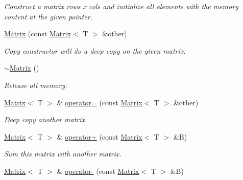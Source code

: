 \begin{DoxyCompactItemize}
\begin{DoxyCompactList}\small\item\em Construct a matrix rows x cols and initialize all elements with the memory content at the given pointer. \end{DoxyCompactList}\item 
\hyperlink{classanpi_1_1Matrix_a336997e2f4cf238db9f2fb9992144f23}{Matrix} (const \hyperlink{classanpi_1_1Matrix}{Matrix}$<$ T $>$ \&other)\hypertarget{classanpi_1_1Matrix_a336997e2f4cf238db9f2fb9992144f23}{}\label{classanpi_1_1Matrix_a336997e2f4cf238db9f2fb9992144f23}

\begin{DoxyCompactList}\small\item\em Copy constructor will do a deep copy on the given matrix. \end{DoxyCompactList}\item 
\hyperlink{classanpi_1_1Matrix_acd9cb8d3e7b77bb14d9ce6d153ac5634}{$\sim$\+Matrix} ()\hypertarget{classanpi_1_1Matrix_acd9cb8d3e7b77bb14d9ce6d153ac5634}{}\label{classanpi_1_1Matrix_acd9cb8d3e7b77bb14d9ce6d153ac5634}

\begin{DoxyCompactList}\small\item\em Release all memory. \end{DoxyCompactList}\item 
\hyperlink{classanpi_1_1Matrix}{Matrix}$<$ T $>$ \& \hyperlink{classanpi_1_1Matrix_acba9e336b083b5d6b58fe24f7942ddbe}{operator=} (const \hyperlink{classanpi_1_1Matrix}{Matrix}$<$ T $>$ \&other)\hypertarget{classanpi_1_1Matrix_acba9e336b083b5d6b58fe24f7942ddbe}{}\label{classanpi_1_1Matrix_acba9e336b083b5d6b58fe24f7942ddbe}

\begin{DoxyCompactList}\small\item\em Deep copy another matrix. \end{DoxyCompactList}\item 
\hyperlink{classanpi_1_1Matrix}{Matrix}$<$ T $>$ \& \hyperlink{classanpi_1_1Matrix_a22e9b98af1622be5bda69334c773fc13}{operator+} (const \hyperlink{classanpi_1_1Matrix}{Matrix}$<$ T $>$ \&B)\hypertarget{classanpi_1_1Matrix_a22e9b98af1622be5bda69334c773fc13}{}\label{classanpi_1_1Matrix_a22e9b98af1622be5bda69334c773fc13}

\begin{DoxyCompactList}\small\item\em Sum this matrix with another matrix. \end{DoxyCompactList}\item 
\hyperlink{classanpi_1_1Matrix}{Matrix}$<$ T $>$ \& \hyperlink{classanpi_1_1Matrix_af9f8390a794ef305a6570c7ab4e91b84}{operator-\/} (const \hyperlink{classanpi_1_1Matrix}{Matrix}$<$ T $>$ \&B)\hypertarget{classanpi_1_1Matrix_af9f8390a794ef305a6570c7ab4e91b84}{}\label{classanpi_1_1Matrix_af9f8390a794ef305a6570c7ab4e91b84}


\end{DoxyCompactItemize}
